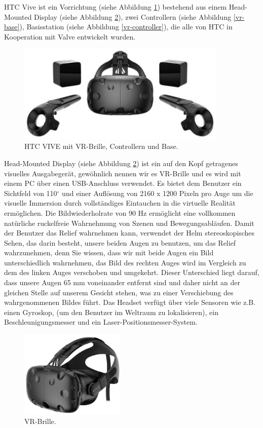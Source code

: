 HTC Vive ist ein Vorrichtung (siehe Abbildung \ref{htc-base}) bestehend aus einem Head-Mounted Display (siehe Abbildung \ref{vr-brille}), zwei Controllern (siehe Abbildung \ref{vr-base}), Basisstation (siehe Abbildung \ref{vr-controller}), die alle von HTC in Kooperation mit Valve entwickelt wurden.
\begin{figure}[h] \centering
\includegraphics[width=10cm]{Images/htc-base.png} 
\caption[HTC VIVE mit VR-Brille, Controllern und Base.]{ HTC VIVE mit VR-Brille, Controllern und Base\cite{vive19}. }
\label{htc-base} 
\end{figure}


Head-Mounted Display (siehe Abbildung \ref{vr-brille}) ist ein auf den Kopf getragenes visuelles Ausgabeger{\"a}t, gew{\"o}hnlich nennen wir es VR-Brille und es wird mit einem PC {\"u}ber einen USB-Anschluss verwendet.
Es bietet dem Benutzer ein Sichtfeld von 110$^\circ$ und einer Aufl{\"o}sung von 2160 x 1200 Pixeln pro Auge um die visuelle Immersion durch vollst{\"a}ndiges Eintauchen in die virtuelle Realit{\"a}t erm{\"o}glichen. 
Die Bildwiederholrate von 90 Hz erm{\"o}glicht eine vollkommen nat{\"u}rliche ruckelfreie Wahrnehmung von Szenen und Bewegungsabl{\"a}ufen. 
Damit der Benutzer das Relief wahrnehmen kann, verwendet der Helm stereoskopisches Sehen, das darin besteht, unsere beiden Augen zu benutzen, um das Relief wahrzunehmen, denn Sie wissen, dass wir mit beide Augen ein  Bild unterschiedlich wahrnehmen, das Bild des rechten Auges wird im Vergleich zu dem des linken Auges verschoben und umgekehrt. 
Dieser Unterschied liegt darauf, dass unsere Augen 65 mm voneinander entfernt sind und daher nicht an der gleichen Stelle auf unserem Gesicht stehen, was zu einer Verschiebung des wahrgenommenen Bildes f{\"u}hrt. 
Das Headset verf{\"u}gt {\"u}ber viele Sensoren wie z.B. einen Gyroskop, (um den Benutzer im Weltraum zu lokalisieren), ein Beschleunigungsmesser und ein Laser-Positionsmesser-System. \\


\begin{figure}[h] \centering
\includegraphics[width=5cm]{Images/vr-brille.png} 
\caption[VR-Brille]{ VR-Brille\cite{vive19}. }
\label{vr-brille} 
\end{figure}


